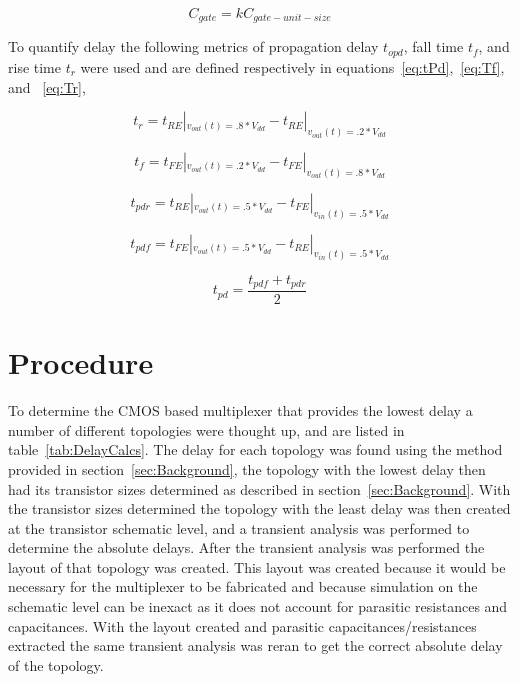 \documentclass[conference]{IEEEtran}
\begin{document}
\begin{equation}
C_{gate} = k C_{gate-unit-size}
\label{eq:capacitanceScaler}
\end{equation}

To quantify delay the following metrics of propagation delay $t_{opd}$, fall time $t_f$, and rise time $t_r$ were used and are defined respectively in equations~\ref{eq:tPd},~\ref{eq:Tf}, and ~\ref{eq:Tr},

\begin{equation}
t_r = t_{RE}|_{v_{out}(t) = .8*V_{dd}} - t_{RE}|_{v_{out}(t) = .2*V_{dd}}
\label{eq:Tr}
\end{equation}

\begin{equation}
t_f = t_{FE}|_{v_{out}(t) = .2*V_{dd}} - t_{FE}|_{v_{out}(t) = .8*V_{dd}}
\label{eq:Tf}
\end{equation}

\begin{equation}
t_{pdr} = t_{RE}|_{v_{out}(t) = .5*V_{dd}} - t_{FE}|_{v_{in}(t) = .5*V_{dd}}
\label{eq:tPdf}
\end{equation}

\begin{equation}
t_{pdf} = t_{FE}|_{v_{out}(t) = .5*V_{dd}} - t_{RE}|_{v_{in}(t) = .5*V_{dd}}
\label{eq:tPdr}
\end{equation}

\begin{equation}
t_{pd} = \frac{t_{pdf} + t_{pdr}}{2}
\label{eq:tPd}
\end{equation}

\section{Procedure}
\label{sec:Procedure}
To determine the CMOS based multiplexer that provides the lowest delay a number of different topologies were thought up, and are listed in table~\ref{tab:DelayCalcs}. The delay for each topology was found using the method provided in section~\ref{sec:Background}, the topology with the lowest delay then had its transistor sizes determined as described in section~\ref{sec:Background}. With the transistor sizes determined the topology with the least delay was then created at the transistor schematic level, and a transient analysis was performed to determine the absolute delays. After the transient analysis was performed the layout of that topology was created. This layout was created because it would be necessary for the multiplexer to be fabricated and because simulation on the schematic level can be inexact as it does not account for parasitic resistances and capacitances. With the layout created and parasitic capacitances/resistances extracted the same transient analysis was reran to get the correct absolute delay of the topology. 
\end{document}
